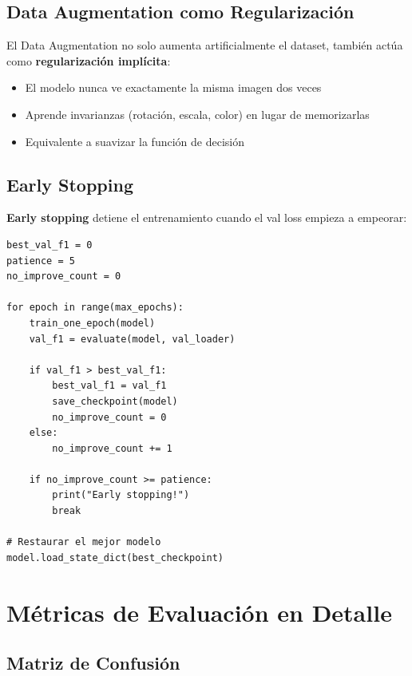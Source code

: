 \documentclass[12pt,a4paper]{article}
\begin{document}
\subsection{Data Augmentation como Regularización}

El Data Augmentation no solo aumenta artificialmente el dataset, también actúa como \textbf{regularización implícita}:

\begin{itemize}
    \item El modelo nunca ve exactamente la misma imagen dos veces
    \item Aprende invarianzas (rotación, escala, color) en lugar de memorizarlas
    \item Equivalente a suavizar la función de decisión
\end{itemize}

\subsection{Early Stopping}

\textbf{Early stopping} detiene el entrenamiento cuando el val loss empieza a empeorar:

\begin{lstlisting}[caption={Early stopping manual}]
best_val_f1 = 0
patience = 5
no_improve_count = 0

for epoch in range(max_epochs):
    train_one_epoch(model)
    val_f1 = evaluate(model, val_loader)

    if val_f1 > best_val_f1:
        best_val_f1 = val_f1
        save_checkpoint(model)
        no_improve_count = 0
    else:
        no_improve_count += 1

    if no_improve_count >= patience:
        print("Early stopping!")
        break

# Restaurar el mejor modelo
model.load_state_dict(best_checkpoint)
\end{lstlisting}

\section{Métricas de Evaluación en Detalle}

\subsection{Matriz de Confusión}
\end{document}
